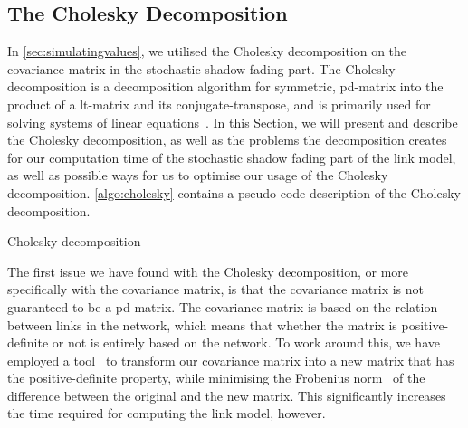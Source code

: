 \subsection{The Cholesky Decomposition}\label{sec:cholesky}
In \autoref{sec:simulatingvalues}, we utilised the Cholesky decomposition on the covariance matrix in the stochastic shadow fading part. The Cholesky decomposition is a decomposition algorithm for \gls{symmetric}, \gls{pd-matrix} into the product of a \gls{lt-matrix} and its \gls{conjugate-transpose}, and is primarily used for solving systems of linear equations~\cite{Press:2007:NRE:1403886}. In this Section, we will present and describe the Cholesky decomposition, as well as the problems the decomposition creates for our computation time of the stochastic shadow fading part of the link model, as well as possible ways for us to optimise our usage of the Cholesky decomposition. \autoref{algo:cholesky} contains a pseudo code description of the Cholesky decomposition. \medbreak

\begin{algorithm}[H]
    \DontPrintSemicolon
    \caption{Cholesky decomposition}
    \label{algo:cholesky}
\end{algorithm}
\medbreak
The first issue we have found with the Cholesky decomposition, or more specifically with the covariance matrix, is that the covariance matrix is not guaranteed to be a \gls{pd-matrix}. The covariance matrix is based on the relation between links in the network, which means that whether the matrix is positive-definite or not is entirely based on the network. To work around this, we have employed a tool~\cite{website:nearestspd} to transform our covariance matrix into a new matrix that has the positive-definite property, while minimising the Frobenius norm~\cite{website:frobieniusnorm} of the difference between the original and the new matrix. This significantly increases the time required for computing the link model, however. \medbreak

